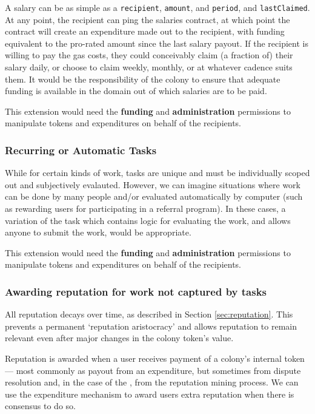 A salary can be as simple as a \texttt{recipient}, \texttt{amount}, and \texttt{period}, and \texttt{lastClaimed}. At any point, the recipient can ping the salaries contract, at which point the contract will create an expenditure made out to the recipient, with funding equivalent to the pro-rated amount since the last salary payout. If the recipient is willing to pay the gas costs, they could conceivably claim (a fraction of) their salary daily, or choose to claim weekly, monthly, or at whatever cadence suits them. It would be the responsibility of the colony to ensure that adequate funding is available in the domain out of which salaries are to be paid.

This extension would need the \textbf{funding} and \textbf{administration} permissions to manipulate tokens and expenditures on behalf of the recipients.

\subsubsection*{Recurring or Automatic Tasks}

While for certain kinds of work, tasks are unique and must be individually scoped out and subjectively evalauted. However, we can imagine situations where work can be done by many people and/or evaluated automatically by computer (such as rewarding users for participating in a referral program). In these cases, a variation of the task which contains logic for evaluating the work, and allows anyone to submit the work, would be appropriate.

This extension would need the \textbf{funding} and \textbf{administration} permissions to manipulate tokens and expenditures on behalf of the recipients.

\subsubsection{Awarding reputation for work not captured by tasks}

All reputation decays over time, as described in Section \ref{sec:reputation}. This prevents a permanent `reputation aristocracy' and allows reputation to remain relevant even after major changes in the colony token's value.

Reputation is awarded when a user receives payment of a colony's internal token --- most commonly as payout from an expenditure, but sometimes from dispute resolution and, in the case of the \rc, from the reputation mining process. We can use the expenditure mechanism to award users extra reputation when there is consensus to do so.

